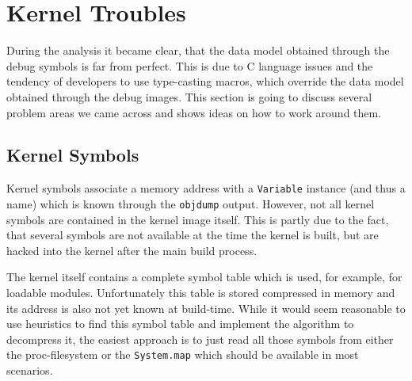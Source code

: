 \section{Kernel Troubles}
During the analysis it became clear, that the data model obtained through the debug symbols is far from perfect.
This is due to C language issues and the tendency of developers to use type-casting macros, which override the data model obtained through the debug images.
This section is going to discuss several problem areas we came across and shows ideas on how to work around them.

\subsection{Kernel Symbols}
Kernel symbols associate a memory address with a \texttt{Variable} instance (and thus a name) which is known through the \texttt{objdump} output.
However, not all kernel symbols are contained in the kernel image itself.
This is partly due to the fact, that several symbols are not available at the time the kernel is built, but are hacked into the kernel after the main build process.

The kernel itself contains a complete symbol table which is used, for example, for loadable modules.
Unfortunately this table is stored compressed in memory and its address is also not yet known at build-time.
While it would seem reasonable to use heuristics to find this symbol table and implement the algorithm to decompress it, the easiest approach is to just read all those symbols from either the proc-filesystem or the \texttt{System.map} which should be available in most scenarios.

